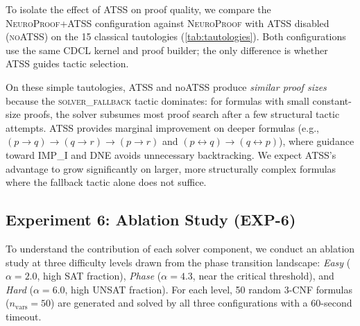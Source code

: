 \documentclass[conference]{IEEEtran}
\newcommand{\NP}{\textsc{NeuroProof}}
\newcommand{\ATSS}{\textsc{ATSS}}
\begin{document}
To isolate the effect of ATSS on proof quality, we compare the
\NP{}+\ATSS{} configuration against \NP{} with ATSS disabled
(\textsc{noATSS}) on the 15 classical tautologies
(\cref{tab:tautologies}).  Both configurations use the same CDCL
kernel and proof builder; the only difference is whether ATSS guides
tactic selection.

On these simple tautologies, ATSS and noATSS produce
\emph{similar proof sizes} because the \textsc{solver\_fallback}
tactic dominates: for formulas with small constant-size proofs,
the solver subsumes most proof search after a few structural
tactic attempts.  ATSS provides marginal improvement on deeper
formulas (e.g., $(p \to q) \to (q \to r) \to (p \to r)$ and
$(p \leftrightarrow q) \to (q \leftrightarrow p)$), where
guidance toward \textsc{IMP\_I} and \textsc{DNE} avoids
unnecessary backtracking.  We expect ATSS's advantage to grow
significantly on larger, more structurally complex formulas where
the fallback tactic alone does not suffice.

\subsection{Experiment 6: Ablation Study \textnormal{(EXP-6)}}

To understand the contribution of each solver component, we conduct
an ablation study at three difficulty levels drawn from the phase
transition landscape: \emph{Easy} ($\alpha=2.0$, high SAT fraction),
\emph{Phase} ($\alpha=4.3$, near the critical threshold), and
\emph{Hard} ($\alpha=6.0$, high UNSAT fraction).  For each level,
50 random 3-CNF formulas ($n_{\text{vars}}=50$) are generated and
solved by all three configurations with a 60-second timeout.
\end{document}
